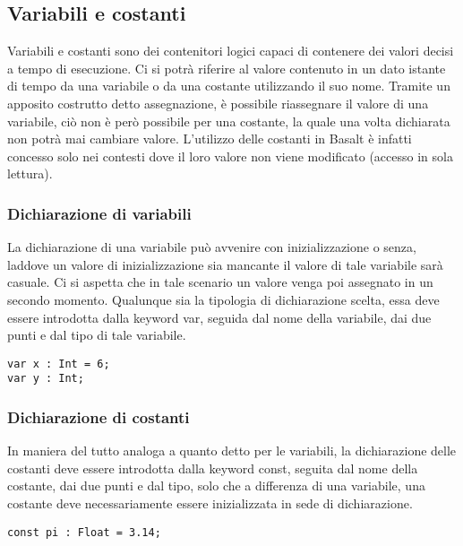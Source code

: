 \subsection{Variabili e costanti}
Variabili e costanti sono dei contenitori logici capaci di contenere dei valori decisi a tempo di esecuzione. Ci si potrà riferire 
al valore contenuto in un dato istante di tempo da una variabile o da una costante utilizzando il suo nome. Tramite un apposito 
costrutto detto assegnazione, è possibile riassegnare il valore di una variabile, ciò non è però possibile per una costante, la quale 
una volta dichiarata non potrà mai cambiare valore. L’utilizzo delle costanti in Basalt è infatti concesso solo nei contesti dove il loro 
valore non viene modificato (accesso in sola lettura). 

\subsubsection{Dichiarazione di variabili}
La dichiarazione di una variabile può avvenire con inizializzazione o senza, laddove un valore di inizializzazione sia mancante il valore 
di tale variabile sarà casuale. Ci si aspetta che in tale scenario un valore venga poi assegnato in un secondo momento. Qualunque sia la 
tipologia di dichiarazione scelta, essa deve essere introdotta dalla keyword var, seguida dal nome della variabile, dai due punti e dal tipo 
di tale variabile.

\vspace{0.5cm}

\begin{lstlisting}[frame=single]
var x : Int = 6;
var y : Int;
\end{lstlisting}


\vspace{0.5cm}

\subsubsection{Dichiarazione di costanti}
In maniera del tutto analoga a quanto detto per le variabili, la dichiarazione delle costanti deve essere introdotta dalla keyword const, 
seguita dal nome della costante, dai due punti e dal tipo, solo che a differenza di una variabile, una costante deve necessariamente essere 
inizializzata in sede di dichiarazione.

\vspace{0.5cm}

\begin{lstlisting}[frame=single]
const pi : Float = 3.14;    
\end{lstlisting}

